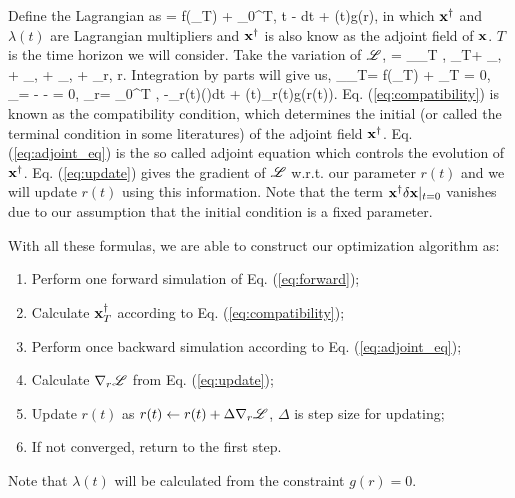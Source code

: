 Define the Lagrangian as
\beq
	\mL = f(\xx_T) + \int_{0}^{T}\la\xd, \frac {\pa\xx} {\pa t} - \ttt \xx\ra dt + \lambda(t)g(r), 
\eeq 
in which ${\bf x}^{\dagger}$ and $\lambda(t)$	are Lagrangian multipliers and ${\bf x}^{\dagger}$ is also know as the adjoint field of ${\bf x}$. $T$ is the time horizon we will consider. Take the variation of ${\mathscr L}$, 
\beq
	\delta \mL = \la\nabla_{\xx_T} \mL, \delta\xx_T\ra + \la\nabla_{\xd}\mL, \delta\xd\ra + \la\nabla_\xx\mL, \delta\xx\ra + \la\nabla_\lambda\mL, \delta\lambda\ra + \la\nabla_r\mL, \delta r\ra. 
\eeq
Integration by parts will give us, 
\beq
	\label{eq:compatibility}
	\nabla_{\xx_T}\mL = \nabla f(\xx_T) + \xd_T = 0,
\eeq
\beq
	\label{eq:adjoint_eq}
	\nabla_\xx\mL = - - \td\xd = 0,
\eeq
\beq
	\label{eq:update}
	\nabla_r\mL = \int_{0}^{T} \la\xd, -\nabla_{r(t)}(\ttt\xx)\ra dt + \lambda(t)\nabla_{r(t)}g(r(t)).
\eeq
Eq. (\ref{eq:compatibility}) is known as the compatibility condition, which determines the initial (or called the terminal condition in some literatures) of the adjoint field ${\bf x}^{\dagger}$. Eq. (\ref{eq:adjoint_eq}) is the so called adjoint equation which controls the evolution of ${\bf x}^{\dagger}$. Eq. (\ref{eq:update}) gives the gradient of ${\mathscr L}$ w.r.t. our parameter $r(t)$ and we will update $r(t)$ using this information. Note that the term ${\bf x}^{\dagger}\delta{\bf x}|_{t=0}$ vanishes due to our assumption that the initial condition is a fixed parameter.

With all these formulas, we are able to construct our optimization algorithm as:
\begin{enumerate}
	\item Perform one forward simulation of Eq. (\ref{eq:forward});
	\item Calculate ${\bf x}^{\dagger}_T$ according to Eq. (\ref{eq:compatibility});
	\item Perform once backward simulation according to Eq. (\ref{eq:adjoint_eq});
	\item Calculate $\nabla_r{\mathscr L}$ from Eq. (\ref{eq:update});
	\item Update $r(t)$ as $r(t) \leftarrow r(t) + \Delta\nabla_r{\mathscr L}$, $\Delta$ is step size for updating;
	\item If not converged, return to the first step.
\end{enumerate}
Note that $\lambda(t)$ will be calculated from the constraint $g(r) = 0$.


% 